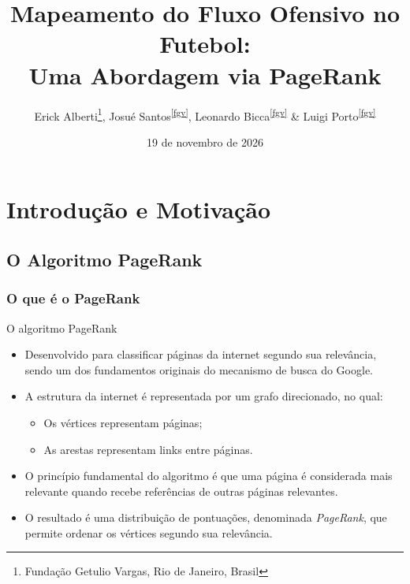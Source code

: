 \documentclass[aspectratio=1610,10pt]{beamer}
\title{Mapeamento do Fluxo Ofensivo no Futebol:\\Uma Abordagem via PageRank}
\author[E. Alberti, J. Santos, L. Bicca \& L. Porto]{%
        Erick Alberti\footnote{\label{fgv}Fundação Getulio Vargas, Rio de Janeiro, Brasil},
        Josué Santos\textsuperscript{\ref{fgv}},
        Leonardo Bicca\textsuperscript{\ref{fgv}} \&
        Luigi Porto\textsuperscript{\ref{fgv}}}
\institute{Apresentado por: Erick Alberti, Josué Santos, Leonardo Bicca e Luigi Porto}
\date{19 de novembro de 2026}
\begin{document}
\begin{frame}[plain]
  \titlepage
\end{frame}

\section{Introdução e Motivação}

\subsection{O Algoritmo PageRank}
\subsubsection{O que é o PageRank}

\begin{frame}{O algoritmo PageRank}
\begin{itemize}
    \setlength{\itemsep}{\medskipamount} %
    \item Desenvolvido para classificar páginas da internet
    segundo sua relevância, sendo um dos fundamentos
    originais do mecanismo de busca do Google.

    \item A estrutura da internet é representada por um
    grafo direcionado, no qual:
    \begin{itemize}
        \item Os vértices representam páginas;
        \item As arestas representam links entre páginas.
    \end{itemize}

    \item O princípio fundamental do algoritmo é que
    uma página é considerada mais relevante quando
    recebe referências de outras páginas relevantes.

    \item O resultado é uma distribuição de pontuações,
    denominada \textit{PageRank}, que permite
    ordenar os vértices segundo sua relevância.
\end{itemize}
\end{frame}


\end{document}
